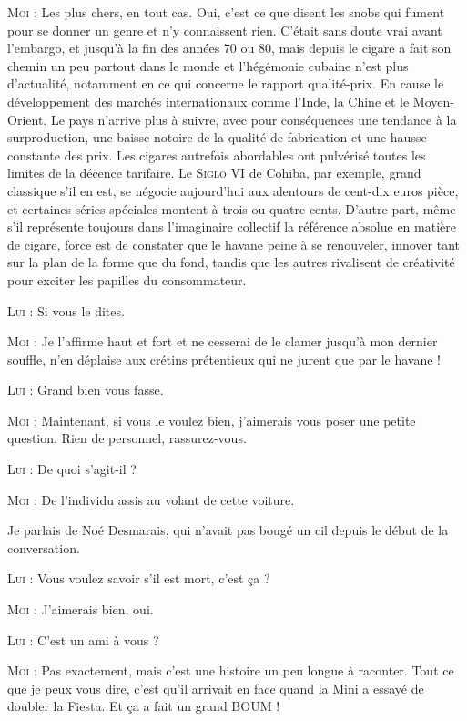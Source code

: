\begin{dialogue}
\textsc{Moi} : Les plus chers, en tout cas. Oui, c’est ce que disent les snobs qui fument pour se donner un genre et n’y connaissent rien. C’était sans doute vrai avant l’embargo, et jusqu’à la fin des années 70 ou 80, mais depuis le cigare a fait son chemin un peu partout dans le monde et l’hégémonie cubaine n’est plus d’actualité, notamment en ce qui concerne le rapport qualité-prix. En cause le développement des marchés internationaux comme l’Inde, la Chine et le Moyen-Orient. Le pays n’arrive plus à suivre, avec pour conséquences une tendance à la surproduction, une baisse notoire de la qualité de fabrication et une hausse constante des prix. Les cigares autrefois abordables ont pulvérisé toutes les limites de la décence tarifaire. Le \textsc{Siglo VI} de Cohiba, par exemple, grand classique s’il en est, se négocie aujourd’hui aux alentours de cent-dix euros pièce, et certaines séries spéciales montent à trois ou quatre cents. D’autre part, même s’il représente toujours dans l’imaginaire collectif la référence absolue en matière de cigare, force est de constater que le havane peine à se renouveler, innover tant sur la plan de la forme que du fond, tandis que les autres rivalisent de créativité pour exciter les papilles du consommateur.

\textsc{Lui} : Si vous le dites.

\textsc{Moi} : Je l’affirme haut et fort et ne cesserai de le clamer jusqu’à mon dernier souffle, n’en déplaise aux crétins prétentieux qui ne jurent que par le havane !

\textsc{Lui} : Grand bien vous fasse.

\textsc{Moi} : Maintenant, si vous le voulez bien, j’aimerais vous poser une petite question. Rien de personnel, rassurez-vous.

\textsc{Lui} : De quoi s’agit-il ?

\textsc{Moi} : De l’individu assis au volant de cette voiture.

Je parlais de Noé Desmarais, qui n’avait pas bougé un cil depuis le début de la conversation.

\textsc{Lui} : Vous voulez savoir s’il est mort, c’est ça ?

\textsc{Moi} : J’aimerais bien, oui.

\textsc{Lui} : C’est un ami à vous ?

\textsc{Moi} : Pas exactement, mais c’est une histoire un peu longue à raconter. Tout ce que je peux vous dire, c’est qu’il arrivait en face quand la Mini a essayé de doubler la Fiesta. Et ça a fait un grand BOUM !


\end{dialogue}
